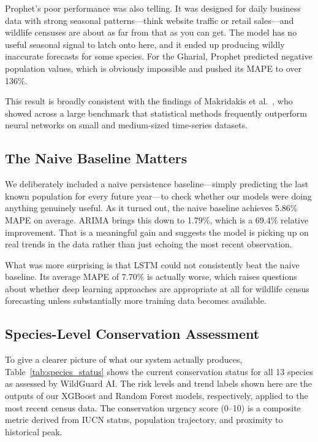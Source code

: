 \documentclass[conference]{IEEEtran}
\begin{document}
Prophet's poor performance was also telling. It was designed for daily business data with strong seasonal patterns---think website traffic or retail sales---and wildlife censuses are about as far from that as you can get. The model has no useful seasonal signal to latch onto here, and it ended up producing wildly inaccurate forecasts for some species. For the Gharial, Prophet predicted negative population values, which is obviously impossible and pushed its MAPE to over 136\%.

This result is broadly consistent with the findings of Makridakis et al.~\cite{makridakis2018}, who showed across a large benchmark that statistical methods frequently outperform neural networks on small and medium-sized time-series datasets.

\subsection{The Naive Baseline Matters}
We deliberately included a naive persistence baseline---simply predicting the last known population for every future year---to check whether our models were doing anything genuinely useful. As it turned out, the naive baseline achieves 5.86\% MAPE on average. ARIMA brings this down to 1.79\%, which is a 69.4\% relative improvement. That is a meaningful gain and suggests the model is picking up on real trends in the data rather than just echoing the most recent observation.

What was more surprising is that LSTM could not consistently beat the naive baseline. Its average MAPE of 7.70\% is actually worse, which raises questions about whether deep learning approaches are appropriate at all for wildlife census forecasting unless substantially more training data becomes available.

\subsection{Species-Level Conservation Assessment}

To give a clearer picture of what our system actually produces, Table~\ref{tab:species_status} shows the current conservation status for all 13 species as assessed by WildGuard AI. The risk levels and trend labels shown here are the outputs of our XGBoost and Random Forest models, respectively, applied to the most recent census data. The conservation urgency score (0--10) is a composite metric derived from IUCN status, population trajectory, and proximity to historical peak.
\end{document}
